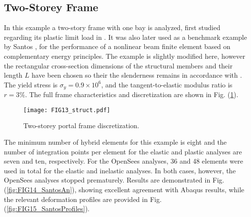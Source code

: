 \begin{figure*}[h]
	\centering
	\qquad
	\caption{Deformation profiles for Lee's frame with fixed supports.}%
	\label{fig:FIG12_LeesFixedProfiles}%
\end{figure*}

\clearpage
\begin{figure*}[t]
	\centering
	\qquad
	\caption{Geometrically nonlinear analyses of Lee's frame with fixed
		supports.}%
	\label{fig:FIG11_LeesFixed}%
\end{figure*}

\subsection{Two-Storey Frame}

In this example a two-story frame with one bay is analyzed, first studied
regarding its plastic limit load in \cite{horne}. It was also later used as a
benchmark example by Santos \cite{Santos1}, for the performance of a nonlinear
beam finite element based on complementary energy principles. The example
is slightly modified here, however the rectangular cross-section
dimensions of the structural members and their length $L$ have been
chosen so their the slenderness remains in accordance with
\cite{Santos1}. The yield stress is $\sigma_y=0.9\times 10^6$, and the
tangent-to-elastic modulus ratio is $r=3\%$. The full frame
characteristics and discretization are shown in Fig. 
(\ref{fig:FIG13_santosStruct}).

\begin{figure}[t]
	\centering
	\texttt{[image: FIG13\_struct.pdf]}
	\caption{Two-storey portal frame discretization.}
	\label{fig:FIG13_santosStruct}
\end{figure}

The minimum number of hybrid elements for this example is eight and the number
of integration points per element for the elastic and plastic analyses are
seven and ten, respectively. For the OpenSees analyses, 36 and 48 elements
were used in total for the elastic and inelastic analyses. In both cases,
however, the OpenSees analyses stopped prematurely. Results are
demonstrated in Fig. (\ref{fig:FIG14_SantosAn}), showing excellent agreement 
with
Abaqus results, while the relevant deformation profiles are
provided in Fig. (\ref{fig:FIG15_SantosProfiles}).

